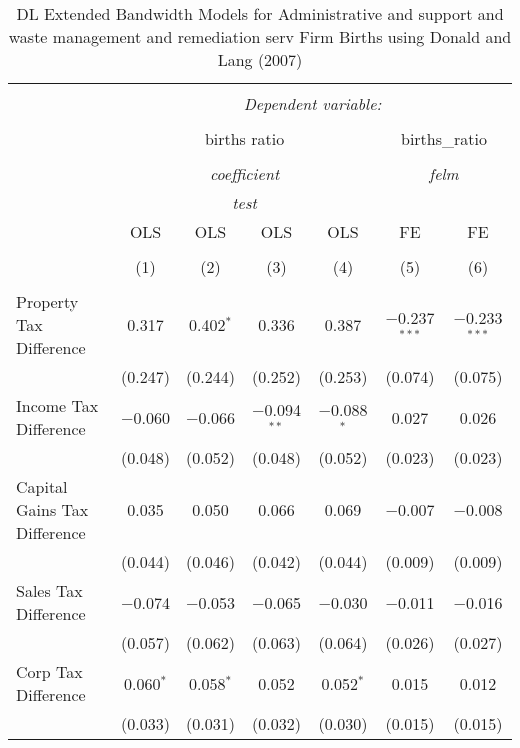 
\begin{table}[!htbp] \centering 
  \caption{DL Extended Bandwidth Models for  Administrative and support and waste management and remediation serv Firm Births using Donald and Lang (2007)} 
  \label{} 
\begin{tabular}{@{\extracolsep{5pt}}lcccccc} 
\\[-1.8ex]\hline 
\hline \\[-1.8ex] 
 & \multicolumn{6}{c}{\textit{Dependent variable:}} \\ 
\cline{2-7} 
\\[-1.8ex] & \multicolumn{4}{c}{births ratio} & \multicolumn{2}{c}{births\_ratio} \\ 
\\[-1.8ex] & \multicolumn{4}{c}{\textit{coefficient}} & \multicolumn{2}{c}{\textit{felm}} \\ 
 & \multicolumn{4}{c}{\textit{test}} & \multicolumn{2}{c}{\textit{}} \\ 
 & OLS & OLS & OLS & OLS & FE & FE \\ 
\\[-1.8ex] & (1) & (2) & (3) & (4) & (5) & (6)\\ 
\hline \\[-1.8ex] 
 Property Tax Difference & 0.317 & 0.402$^{*}$ & 0.336 & 0.387 & $-$0.237$^{***}$ & $-$0.233$^{***}$ \\ 
  & (0.247) & (0.244) & (0.252) & (0.253) & (0.074) & (0.075) \\ 
  Income Tax Difference & $-$0.060 & $-$0.066 & $-$0.094$^{**}$ & $-$0.088$^{*}$ & 0.027 & 0.026 \\ 
  & (0.048) & (0.052) & (0.048) & (0.052) & (0.023) & (0.023) \\ 
  Capital Gains Tax Difference & 0.035 & 0.050 & 0.066 & 0.069 & $-$0.007 & $-$0.008 \\ 
  & (0.044) & (0.046) & (0.042) & (0.044) & (0.009) & (0.009) \\ 
  Sales Tax Difference & $-$0.074 & $-$0.053 & $-$0.065 & $-$0.030 & $-$0.011 & $-$0.016 \\ 
  & (0.057) & (0.062) & (0.063) & (0.064) & (0.026) & (0.027) \\ 
  Corp Tax Difference & 0.060$^{*}$ & 0.058$^{*}$ & 0.052 & 0.052$^{*}$ & 0.015 & 0.012 \\ 
  & (0.033) & (0.031) & (0.032) & (0.030) & (0.015) & (0.015) \\ 

\end{tabular}
\end{table}
